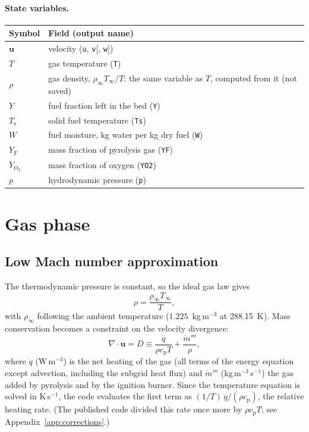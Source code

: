 \documentclass[11pt,a4paper]{article}
\newcommand{\vu}{\mathbf{u}}
\newcommand{\code}[1]{\texttt{#1}}
\newcommand{\Yf}{Y_\text{F}}
\newcommand{\YO}{Y_{\mathrm{O_2}}}
\begin{document}
\paragraph{State variables.}
\begin{center}
\begin{tabular}{lp{11cm}}
\toprule
Symbol & Field (output name) \\
\midrule
$\vu$ & velocity (\code{u}, \code{v}[, \code{w}]) \\
$T$ & gas temperature (\code{T}) \\
$\rho$ & gas density, $\rho_\infty T_\infty/T$: the same variable as $T$, computed from it (not saved) \\
$Y$ & fuel fraction left in the bed (\code{Y}) \\
$T_\text{s}$ & solid fuel temperature (\code{Ts}) \\
$W$ & fuel moisture, kg water per kg dry fuel (\code{W}) \\
$\Yf$ & mass fraction of pyrolysis gas (\code{YF}) \\
$\YO$ & mass fraction of oxygen (\code{YO2}) \\
$p$ & hydrodynamic pressure (\code{p}) \\
\bottomrule
\end{tabular}
\end{center}

\section{Gas phase}\label{sec:gas}

\subsection{Low Mach number approximation}
The thermodynamic pressure is constant, so the ideal gas law gives
\begin{equation}
  \rho = \frac{\rho_\infty T_\infty}{T},
\end{equation}
with $\rho_\infty$ following the ambient temperature ($1.225$~kg\,m$^{-3}$ at 288.15~K). Mass
conservation becomes a constraint on the velocity divergence:
\begin{equation}\label{eq:div}
  \nabla\cdot\vu = D \equiv \frac{\dot q}{\rho c_\text{p} T} + \frac{\dot m'''}{\rho},
\end{equation}
where $\dot q$ (W\,m$^{-3}$) is the net heating of the gas (all terms of the energy equation except
advection, including the subgrid heat flux) and $\dot m'''$ (kg\,m$^{-3}$\,s$^{-1}$) the gas added by
pyrolysis and by the ignition burner. Since the temperature equation is solved in K\,s$^{-1}$, the code
evaluates the first term as $(1/T)\,\dot q/(\rho c_\text{p})$, the relative heating rate. (The published
code divided this rate once more by $\rho c_\text{p} T$; see Appendix~\ref{app:corrections}.)
\end{document}
